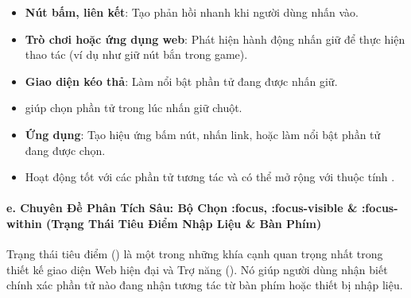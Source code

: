 \begin{tipBox}
\begin{itemize}[leftmargin=1.5em, itemsep=3pt, parsep=0pt]
    \item \textbf{Nút bấm, liên kết}: Tạo phản hồi nhanh khi người dùng nhấn vào.
    \item \textbf{Trò chơi hoặc ứng dụng web}: Phát hiện hành động nhấn giữ để thực hiện thao tác (ví dụ như giữ nút bắn trong game).
    \item \textbf{Giao diện kéo thả}: Làm nổi bật phần tử đang được nhấn giữ.
\end{itemize}
\end{tipBox}

\begin{conceptBox}
\begin{itemize}[leftmargin=1.5em, itemsep=2pt, parsep=0pt]
    \item {} giúp chọn phần tử trong lúc nhấn giữ chuột.
    \item \textbf{Ứng dụng}: Tạo hiệu ứng bấm nút, nhấn link, hoặc làm nổi bật phần tử đang được chọn.
    \item Hoạt động tốt với các phần tử tương tác và có thể mở rộng với thuộc tính .
\end{itemize}
\end{conceptBox}

\paragraph{e. Chuyên Đề Phân Tích Sâu: Bộ Chọn :focus, :focus-visible \& :focus-within (Trạng Thái Tiêu Điểm Nhập Liệu \& Bàn Phím)}

Trạng thái tiêu điểm () là một trong những khía cạnh quan trọng nhất trong thiết kế giao diện Web hiện đại và Trợ năng (). Nó giúp người dùng nhận biết chính xác phần tử nào đang nhận tương tác từ bàn phím hoặc thiết bị nhập liệu.

